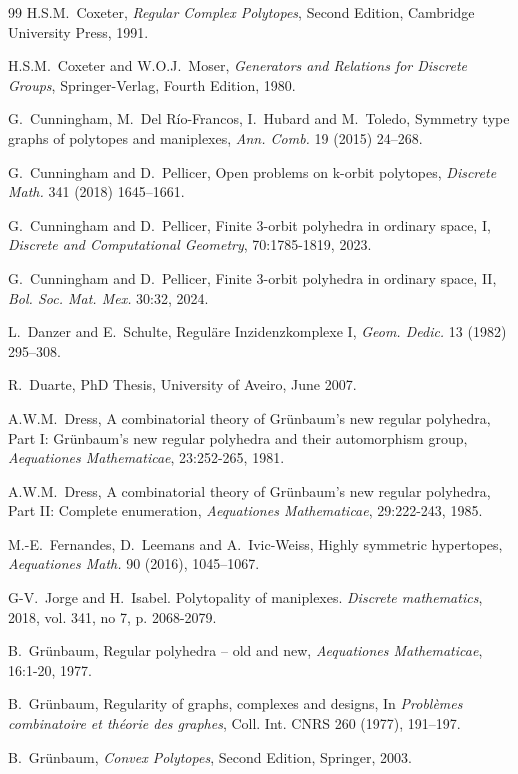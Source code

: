 \documentclass[12pt]{article}
\renewcommand{\>}{\rangle}
\theoremstyle{definition}\newtheorem{definition}{Definition}[section]
\begin{document}
\begin{thebibliography}{99}
H.S.M.~Coxeter, \textit{Regular Complex Polytopes}, Second Edition, Cambridge University Press, 1991.

H.S.M.~Coxeter and W.O.J.~Moser, \textit{Generators and Relations for Discrete Groups}, Springer-Verlag, Fourth Edition, 1980.

 G.~Cunningham, M.~Del Río-Francos, I.~Hubard and M.~Toledo, Symmetry type graphs of polytopes and maniplexes, \textit{Ann. Comb.} 19 (2015) 24--268.

 G.~Cunningham and D.~Pellicer, Open problems on k-orbit polytopes, \textit{Discrete Math.} 341 (2018) 1645--1661.

G.~Cunningham and D.~Pellicer, Finite 3-orbit polyhedra in ordinary space, I,  \textit{Discrete and Computational Geometry}, 70:1785-1819, 2023.

G.~Cunningham and D.~Pellicer, Finite 3-orbit polyhedra in ordinary space, II, \textit{Bol. Soc. Mat. Mex.} 30:32, 2024.

L.~Danzer and E.~Schulte, Regul\"are Inzidenzkomplexe I, \textit{Geom. Dedic.} 13 (1982) 295--308.

R.~Duarte, PhD Thesis, University of Aveiro, June 2007.

 A.W.M.~Dress, A combinatorial theory of Grünbaum's new regular polyhedra, Part I: Grünbaum's new regular polyhedra and their automorphism group, \textit{Aequationes Mathematicae}, 23:252-265, 1981. 

A.W.M.~Dress, A combinatorial theory of Grünbaum’s new regular polyhedra, Part II: Complete enumeration, \textit{Aequationes Mathematicae}, 29:222-243, 1985.

 M.-E.~Fernandes, D.~Leemans and A.~Ivic-Weiss, Highly symmetric hypertopes, \textit{Aequationes Math.} 90 (2016), 1045--1067.

G-V.~Jorge and H.~Isabel. Polytopality of maniplexes. \textit{Discrete mathematics}, 2018, vol. 341, no 7, p. 2068-2079.

B.~Grünbaum, Regular polyhedra -- old and new, \textit{Aequationes Mathematicae}, 16:1-20, 1977.

B.~Gr\"unbaum, Regularity of graphs, complexes and designs, In {\em Probl\`{e}mes combinatoire et th\'{e}orie des graphes\/}, Coll. Int. CNRS 260 (1977), 191--197.

B.~Gr\"unbaum, \textit{Convex Polytopes}, Second Edition, Springer, 2003.


\end{thebibliography}
\end{document}
